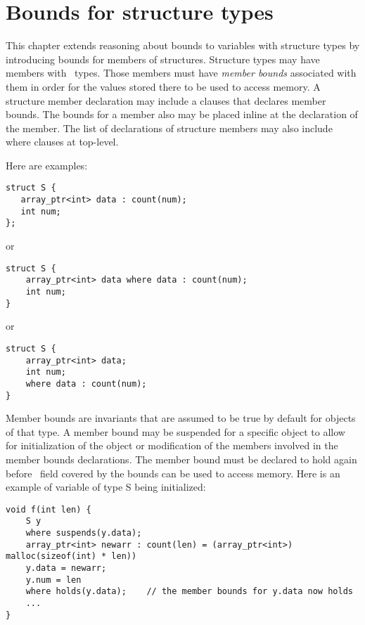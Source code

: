 
\chapter{Bounds for structure types}
\label{chapter:structure-bounds}

This chapter extends reasoning about bounds to variables with structure
types by introducing bounds for members of structures.   
Structure types may have members with \arrayptr\ types. Those
members must have \emph{member bounds} associated with them in order for
the values stored there to be used to access memory. A structure member
declaration may include a  clauses that declares member
bounds. The bounds for a member also may be placed inline at the
declaration of the member. The list of declarations of structure members
may also include where clauses at top-level. 

Here are examples:

\begin{verbatim}
struct S {
   array_ptr<int> data : count(num);
   int num;
};
\end{verbatim}

or

\begin{verbatim}
struct S {
    array_ptr<int> data where data : count(num);
    int num;
}
\end{verbatim}

or

\begin{verbatim}
struct S {
    array_ptr<int> data;
    int num;
    where data : count(num);
}
\end{verbatim}

Member bounds are invariants that are assumed to be true by default for
objects of that type. A member bound may be suspended for a specific
object to allow for initialization of the object or modification of the
members involved in the member bounds declarations. The member bound
must be declared to hold again before \arrayptr\ field covered
by the bounds can be used to access memory. Here is an example of
variable of type S being initialized:

\begin{verbatim}
void f(int len) {
    S y 
    where suspends(y.data);
    array_ptr<int> newarr : count(len) = (array_ptr<int>) malloc(sizeof(int) * len))
    y.data = newarr;
    y.num = len
    where holds(y.data);    // the member bounds for y.data now holds
    ...
}
\end{verbatim}

